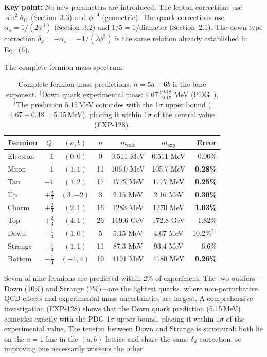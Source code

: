 \documentclass[12pt,a4paper]{article}
\begin{document}
\textbf{Key point:} No new parameters are introduced. The lepton corrections use $\sin^2\theta_W$ (Section~3.3) and $\phi^{-4}$ (geometric). The quark corrections use $\alpha_s = 1/(2\phi^3)$ (Section~3.2) and $1/5 = 1/\text{diameter}$ (Section~2.1). The down-type correction $\delta_k = -\alpha_s = -1/(2\phi^3)$ is the same relation already established in Eq.~(6).

The complete fermion mass spectrum:

\begin{table}[H]
\centering
\begin{tabular}{lcccccr}
\toprule
\textbf{Fermion} & $Q$ & $(a,b)$ & $n$ & $m_{\text{calc}}$ & $m_{\text{exp}}$ & \textbf{Error} \\
\midrule
Electron & $-1$ & $(0,0)$ & 0 & 0.511 MeV & 0.511 MeV & 0.00\% \\
Muon & $-1$ & $(1,1)$ & 11 & 106.0 MeV & 105.7 MeV & \textbf{0.28\%} \\
Tau & $-1$ & $(1,2)$ & 17 & 1772 MeV & 1777 MeV & \textbf{0.25\%} \\
\midrule
Up & $+\tfrac{2}{3}$ & $(3,-2)$ & 3 & 2.15 MeV & 2.16 MeV & \textbf{0.30\%} \\
Charm & $+\tfrac{2}{3}$ & $(2,1)$ & 16 & 1283 MeV & 1270 MeV & \textbf{1.03\%} \\
Top & $+\tfrac{2}{3}$ & $(4,1)$ & 26 & 169.6 GeV & 172.8 GeV & 1.82\% \\
\midrule
Down & $-\tfrac{1}{3}$ & $(1,0)$ & 5 & 5.15 MeV & 4.67 MeV & $10.2\%^\dagger\!^\ddagger$ \\
Strange & $-\tfrac{1}{3}$ & $(1,1)$ & 11 & 87.3 MeV & 93.4 MeV & 6.6\% \\
Bottom & $-\tfrac{1}{3}$ & $(-1,4)$ & 19 & 4191 MeV & 4180 MeV & \textbf{0.26\%} \\
\bottomrule
\end{tabular}
\caption{Complete fermion mass predictions. $n = 5a + 6b$ is the bare exponent. $^\dagger$Down quark experimental mass: $4.67^{+0.48}_{-0.17}$ MeV (PDG~\cite{pdg2024}). $^\ddagger$The prediction 5.15\,MeV coincides with the 1$\sigma$ upper bound ($4.67 + 0.48 = 5.15$\,MeV), placing it within $1\sigma$ of the central value (EXP-128).}
\end{table}

Seven of nine fermions are predicted within 2\% of experiment. The two outliers---Down ($10\%$) and Strange ($7\%$)---are the lightest quarks, where non-perturbative QCD effects and experimental mass uncertainties are largest. A comprehensive investigation (EXP-128) shows that the Down quark prediction (5.15\,MeV) coincides exactly with the PDG 1$\sigma$ upper bound, placing it within $1\sigma$ of the experimental value. The tension between Down and Strange is structural: both lie on the $a = 1$ line in the $(a,b)$ lattice and share the same $\delta_d$ correction, so improving one necessarily worsens the other.
\end{document}
